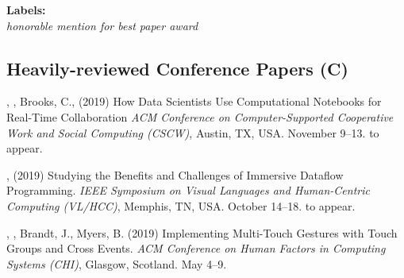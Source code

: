
\cvitem{
    ~\\
    \honorable{}
} {
    \textbf{Labels:}\\
    \textit{honorable mention for best paper award}
}


\subsection{Heavily-reviewed Conference Papers (C)}

 {
    , , Brooks, C.,  (2019) How Data Scientists Use Computational Notebooks for Real-Time Collaboration 
    \textit{ACM Conference on Computer-Supported Cooperative Work and Social Computing (CSCW)}, Austin, TX, USA. November 9--13. to appear.
}

 {
    ,  (2019) Studying the Benefits and Challenges of Immersive Dataflow Programming.
    \textit{IEEE Symposium on Visual Languages and Human-Centric Computing (VL/HCC)}, Memphis, TN, USA. October 14--18. to appear.
}


 {
    , , Brandt, J., Myers, B. (2019) Implementing Multi-Touch Gestures with Touch Groups and Cross Events. \textit{ACM Conference on Human Factors in Computing Systems (CHI)}, Glasgow, Scotland. May 4--9.
}

